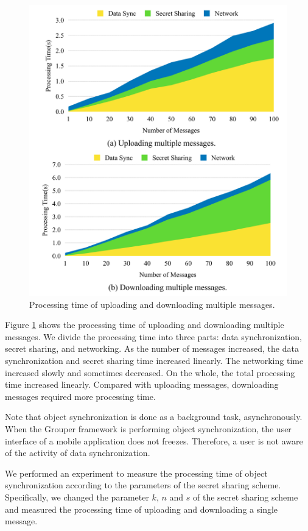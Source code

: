 \documentclass[a4paper,11pt]{report}
\begin{document}
\begin{figure}[t]
	\centering
	\includegraphics[scale=0.17]{multiple_messages}
	\caption{Processing time of uploading and downloading multiple messages.}
	\label{fig:processing_time_multiple_message}
\end{figure}

Figure \ref{fig:processing_time_multiple_message} shows the processing time of uploading and downloading multiple messages.
We divide the processing time into three parts: data synchronization, secret sharing, and networking.
As the number of messages increased, the data synchronization and secret sharing time increased linearly. 
The networking time increased slowly and sometimes decreased.
On the whole, the total processing time increased linearly.
Compared with uploading messages, downloading messages required more processing time.

Note that object synchronization is done as a background task, asynchronously.
When the Grouper framework is performing object synchronization, the user interface of a mobile application does not freezes.
Therefore, a user is not aware of the activity of data synchronization.

We performed an experiment to measure the processing time of object synchronization according to the parameters of the secret sharing scheme.
Specifically, we changed the parameter $k$, $n$ and $s$ of the secret sharing scheme and measured the processing time of uploading and downloading a single message.
\end{document}
